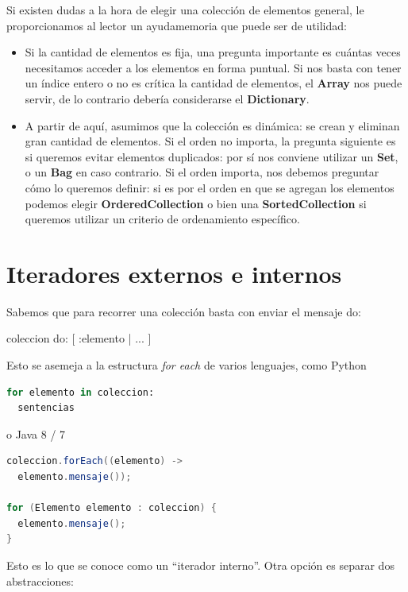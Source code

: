 \documentclass[a4paper,12pt]{book}
\begin{document}
Si existen dudas a la hora de elegir una colección de elementos general, le proporcionamos al
lector un ayudamemoria que puede ser de utilidad:

\begin{itemize}
 \item Si la cantidad de elementos es fija, una pregunta importante es cuántas veces necesitamos acceder
 a los elementos en forma puntual. Si nos basta con tener un índice entero o no es crítica la cantidad
 de elementos, el \textbf{Array} nos puede servir, de lo contrario debería considerarse el \textbf{Dictionary}.
 \item A partir de aquí, asumimos que la colección es dinámica: se crean y eliminan gran cantidad de elementos.
 Si el orden no importa, la pregunta siguiente es si queremos evitar elementos duplicados: por sí nos conviene
 utilizar un \textbf{Set}, o un \textbf{Bag} en caso contrario. Si el orden importa, nos debemos preguntar cómo
 lo queremos definir: si es por el orden en que se agregan los elementos podemos elegir \textbf{OrderedCollection}
 o bien una \textbf{SortedCollection} si queremos utilizar un criterio de ordenamiento específico. 
\end{itemize}

\section{Iteradores externos e internos}

Sabemos que para recorrer una colección basta con enviar el mensaje do: 

\begin{code}
coleccion do: [ :elemento | ... ]
\end{code}

Esto se asemeja a la estructura \textit{for each} de varios lenguajes, como Python

\begin{lstlisting}[language=Python]  
for elemento in coleccion:
  sentencias
\end{lstlisting}

o Java 8 / 7
\begin{lstlisting}[language=Java]  
coleccion.forEach((elemento) ->
  elemento.mensaje());
  
for (Elemento elemento : coleccion) {
  elemento.mensaje();
}
\end{lstlisting}

Esto es lo que se conoce como un ``iterador interno''. Otra opción es separar dos abstracciones:
\end{document}
